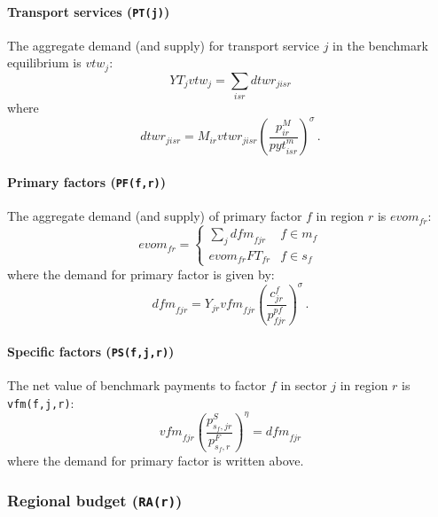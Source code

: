 \paragraph{\bf Transport services (\texttt{PT(j)})}

The aggregate demand (and supply) for transport service $j$ in the benchmark equilibrium is $\textit{vtw}_j$:
\begin{equation}
\textit{YT}_j  \textit{vtw}_j = \sum_{isr} \textit{dtwr}_{jisr}
\end{equation}
where
$$\textit{dtwr}_{jisr} = M_{ir} \textit{vtwr}_{jisr}  \left(
\frac{p^M_{ir}}{\textit{pyt}^m_{isr}} \right)^\sigma\,.$$

\paragraph{\bf Primary factors (\texttt{PF(f,r)})}

The aggregate demand (and supply) of primary factor $f$ in region $r$ is $\textit{evom}_{fr}$:
\begin{equation}
\textit{evom}_{fr} = \left\{
\begin{array}{lr}
\sum_j \textit{dfm}_{fjr} & f \in m_f \\
\textit{evom}_{fr} \textit{FT}_{fr} & f \in s_f
\end{array} \right.
\end{equation}
where the demand for primary factor is given by:
$$\textit{dfm}_{fjr}  = Y_{jr} \textit{vfm}_{fjr}
\left( \frac{c^f_{jr}}{p^{pf}_{fjr}}\right)^\sigma\,.$$

\paragraph{\bf Specific factors (\texttt{PS(f,j,r)})}

The net value of benchmark payments to factor $f$ in sector $j$ in region $r$ is \texttt{vfm(f,j,r)}:
\begin{equation}
\textit{vfm}_{fjr} \left( \frac{p^S_{s_{f},jr}}{p^F_{s_{f},r}} \right)^\eta =
\textit{dfm}_{fjr}\end{equation}
where the demand for primary factor is written above.

\subsubsection[Regional budget]{Regional budget (\texttt{RA(r)})}

